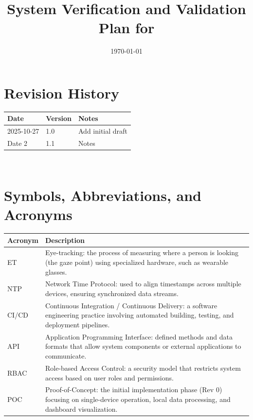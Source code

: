 \documentclass[12pt, titlepage]{article}
\begin{document}
\title{System Verification and Validation Plan for \progname{}} 
\author{\authname}
\date{\today}
	
\maketitle


\section*{Revision History}

\begin{tabularx}{\textwidth}{p{3cm}p{2cm}X}
\toprule {\bf Date} & {\bf Version} & {\bf Notes}\\
\midrule
2025-10-27 & 1.0 & Add initial draft\\
Date 2 & 1.1 & Notes\\
\bottomrule
\end{tabularx}

~\\

\newpage

\tableofcontents

\newpage

\section{Symbols, Abbreviations, and Acronyms}

\renewcommand{\arraystretch}{1.2}
\begin{tabular}{l p{10cm}} 
  \toprule		
  \textbf{Acronym} & \textbf{Description}\\
  \midrule 
  ET & Eye-tracking: the process of measuring where a person is looking (the gaze point) using specialized hardware, such as wearable glasses.\\
  NTP & Network Time Protocol: used to align timestamps across multiple devices, ensuring synchronized data streams.\\
  CI/CD & Continuous Integration / Continuous Delivery: a software engineering practice involving automated building, testing, and deployment pipelines.\\
  API & Application Programming Interface: defined methods and data formats that allow system components or external applications to communicate.\\
  RBAC & Role-based Access Control: a security model that restricts system access based on user roles and permissions.\\
  POC & Proof-of-Concept: the initial implementation phase (Rev 0) focusing on single-device operation, local data processing, and dashboard visualization.\\
  \bottomrule
\end{tabular}
\end{document}
